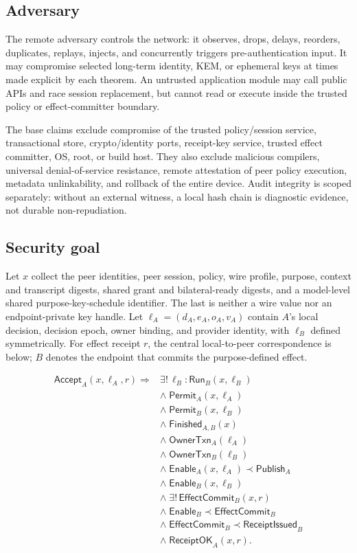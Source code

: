 \documentclass[journal]{IEEEtran}
\begin{document}
\subsection{Adversary}
The remote adversary controls the network: it observes, drops, delays, reorders,
duplicates, replays, injects, and concurrently triggers pre-authentication input.
It may compromise selected long-term identity, KEM, or ephemeral keys at times
made explicit by each theorem. An untrusted application module may call public
APIs and race session replacement, but cannot read or execute inside the trusted
policy or effect-committer boundary.

The base claims exclude compromise of the trusted policy/session service,
transactional store, crypto/identity ports, receipt-key service, trusted effect
committer, OS, root, or build host. They also exclude malicious
compilers, universal denial-of-service resistance, remote attestation of peer
policy execution, metadata unlinkability, and rollback of the entire device.
Audit integrity is scoped separately: without an external witness, a local hash
chain is diagnostic evidence, not durable non-repudiation.

\subsection{Security goal}
Let $x$ collect the peer identities, peer session, policy, wire profile, purpose,
context and transcript digests, shared grant and bilateral-ready digests, and a
model-level shared purpose-key-schedule identifier. The last is neither a wire
value nor an endpoint-private key handle. Let $\ell_A=(d_A,e_A,o_A,v_A)$ contain $A$'s local decision,
decision epoch, owner binding, and provider identity, with $\ell_B$ defined
symmetrically. For effect receipt $r$, the
central local-to-peer correspondence is below; $B$ denotes the endpoint that
commits the purpose-defined effect.

\begin{equation}
\begin{split}
\mathsf{Accept}_A(x,\ell_A,r) \Rightarrow {} &
\exists!\,\ell_B:\mathsf{Run}_B(x,\ell_B)\\
&\land\;\mathsf{Permit}_A(x,\ell_A)\\
&\land\;\mathsf{Permit}_B(x,\ell_B)\\
&\land\;\mathsf{Finished}_{A,B}(x)\\
&\land\;\mathsf{OwnerTxn}_A(\ell_A)\\
&\land\;\mathsf{OwnerTxn}_B(\ell_B)\\
&\land\;\mathsf{Enable}_A(x,\ell_A) \prec \mathsf{Publish}_A\\
&\land\;\mathsf{Enable}_B(x,\ell_B)\\
&\land\;\exists!\,\mathsf{EffectCommit}_B(x,r)\\
&\land\;\mathsf{Enable}_B \prec \mathsf{EffectCommit}_B\\
&\land\;\mathsf{EffectCommit}_B \prec \mathsf{ReceiptIssued}_B\\
&\land\;\mathsf{ReceiptOK}_A(x,r).
\end{split}
\label{eq:central-goal}
\end{equation}
\end{document}
